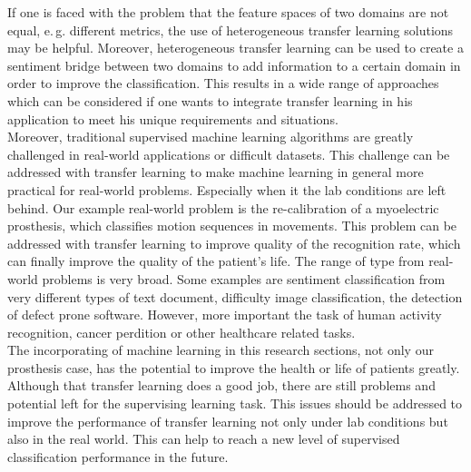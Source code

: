 If one is faced with the problem that the feature spaces of two domains are not equal, e.\,g. different metrics, the use of heterogeneous transfer learning solutions may be helpful.
Moreover, heterogeneous transfer learning can be used to create a sentiment bridge between two domains to add information to a certain domain in order to improve the classification.
This results in a wide range of approaches which can be considered if one wants to integrate transfer learning in his application to meet his unique requirements and situations.\\
Moreover, traditional supervised machine learning algorithms are greatly challenged in real-world applications or difficult datasets.\cite{Pan.2010}
This challenge can be addressed with transfer learning to make machine learning in general more practical for real-world problems.
Especially when it the lab conditions are left behind. 
Our example real-world problem is the re-calibration of a myoelectric prosthesis, which classifies motion sequences in movements. 
This problem can be addressed with transfer learning to improve quality of the recognition rate, which can finally improve the quality of the patient's life.
The range of type from real-world problems is very broad.
Some examples are sentiment classification from very different types of text document, difficulty image classification, the detection of defect prone software.\cite{Weiss.2016}
However, more important the task of human activity recognition, cancer perdition or other healthcare related tasks.\cite{Burlina.2017}\cite{Kourou.2015}\\
The incorporating of machine learning in this research sections, not only our prosthesis case, has the potential to improve the health or life of patients greatly.
Although that transfer learning does a good job, there are still problems and potential left for the supervising learning task.
This issues should be addressed to improve the performance of transfer learning not only under lab conditions but also in the real world.
This can help to reach a new level of supervised classification performance in the future.
